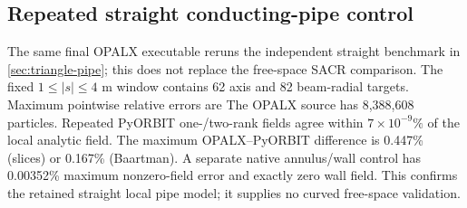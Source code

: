 \subsection{Repeated straight conducting-pipe control}
The same final OPALX executable reruns the independent straight benchmark in
\cref{sec:triangle-pipe}; this does not replace the free-space SACR comparison.
The fixed $1\le|s|\le4$ m window contains 62 axis and 82 beam-radial targets.
Maximum pointwise relative errors are
The OPALX source has 8,388,608 particles. Repeated PyORBIT one-/two-rank
fields agree within $7\times10^{-9}\%$ of the local analytic field. The
maximum OPALX--PyORBIT difference is 0.447\% (slices) or 0.167\%
(Baartman). A separate native annulus/wall control has 0.00352\% maximum
nonzero-field error and exactly zero wall field. This confirms the retained
straight local pipe model; it supplies no curved free-space validation.
